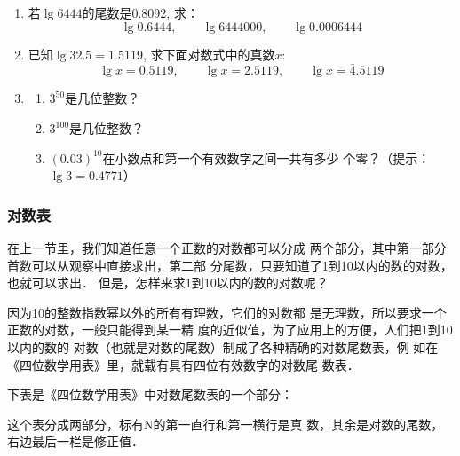 \begin{ex}
\begin{enumerate}
\item 若$\lg6444$的尾数是0.8092, 求：
\[\lg0.6444,\qquad \lg6444000,\qquad \lg0.0006444\]
\item 已知$\lg32.5=1.5119$, 求下面对数式中的真数$x$:
\[\lg x=0.5119,\qquad \lg x=2.5119,\qquad \lg x=\bar{4}.5119\]
\item \begin{enumerate}
\item $3^{50}$是几位整数？
\item $3^{100}$是几位整数？
\item $(0.03)^{10}$在小数点和第一个有效数字之间一共有多少
个零？（提示：$\lg3=0.4771$）
\end{enumerate}
\end{enumerate}
\end{ex}

\subsubsection{对数表}
在上一节里，我们知道任意一个正数的对数都可以分成
两个部分，其中第一部分首数可以从观察中直接求出，第二部
分尾数，只要知道了1到10以内的数的对数，也就可以求出．
但是，怎样来求1到10以内的数的对数呢？

因为10的整数指数幂以外的所有有理数，它们的对数都
是无理数，所以要求一个正数的对数，一般只能得到某一精
度的近似值，为了应用上的方便，人们把1到10以内的数的
对数（也就是对数的尾数）制成了各种精确的对数尾数表，例
如在《四位数学用表》里，就载有具有四位有效数字的对数尾
数表．

下表是《四位数学用表》中对数尾数表的一个部分：

这个表分成两部分，标有N的第一直行和第一横行是真
数，其余是对数的尾数，右边最后一栏是修正值．

\begin{center}
\end{center}

